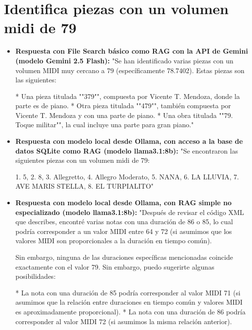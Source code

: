 \begin{itemize}
\end{itemize}

\section{Identifica piezas con un volumen midi de 79}
\begin{itemize}
    \item \textbf{Respuesta con File Search básico como RAG con la API de Gemini (modelo Gemini 2.5 Flash):} "Se han identificado varias piezas con un volumen MIDI muy cercano a 79 (específicamente 78.7402). Estas piezas son las siguientes:

*   Una pieza titulada ""379"", compuesta por Vicente T. Mendoza, donde la parte es de piano.
*   Otra pieza titulada ""479"", también compuesta por Vicente T. Mendoza y con una parte de piano.
*   Una obra titulada ""79. Toque militar"", la cual incluye una parte para gran piano."
    \item \textbf{Respuesta con modelo local desde Ollama, con acceso a la base de datos SQLite como RAG (modelo llama3.1:8b):} "Se encontraron las siguientes piezas con un volumen midi de 79: 

1. 5,
2. 8,
3. Allegretto,
4. Allegro Moderato,
5. NANA,
6. LA LLUVIA,
7. AVE MARIS STELLA,
8. EL TURPIALITO"
    \item \textbf{Respuesta con modelo local desde Ollama, con RAG simple no especializado (modelo llama3.1:8b):} "Después de revisar el código XML que describes, encontré varias notas con una duración de 86 o 85, lo cual podría corresponder a un valor MIDI entre 64 y 72 (si asumimos que los valores MIDI son proporcionales a la duración en tiempo común).

Sin embargo, ninguna de las duraciones específicas mencionadas coincide exactamente con el valor 79. Sin embargo, puedo sugerirte algunas posibilidades:

* La nota con una duración de 85 podría corresponder al valor MIDI 71 (si asumimos que la relación entre duraciones en tiempo común y valores MIDI es aproximadamente proporcional).
* La nota con una duración de 86 podría corresponder al valor MIDI 72 (si asumimos la misma relación anterior).


\end{itemize}
